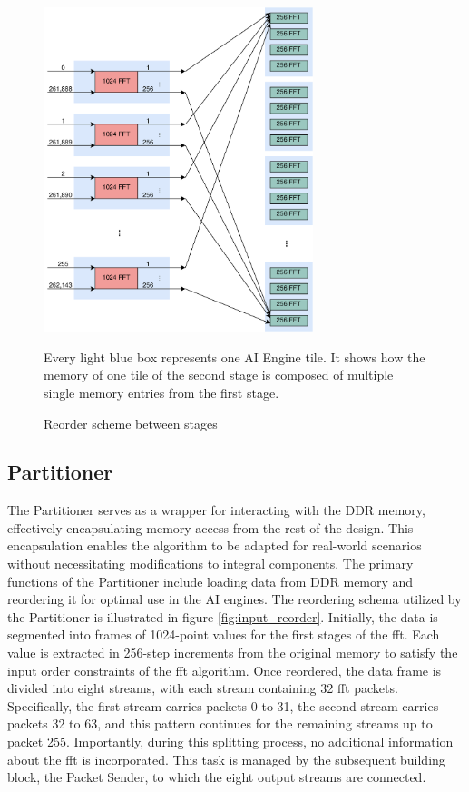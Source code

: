 \begin{figure}[h]
    \centering
    \includegraphics[width=0.7\textwidth]{images/stage_reorder.png}
    \captionsetup{justification=centering}
    \caption{Reorder scheme between stages}
            Every light blue box represents one AI Engine tile. It shows how the memory of one tile of the second stage is composed of multiple single memory entries from the first stage.
    \label{fig:stage_reorder}
\end{figure}

\subsection{Partitioner}
The Partitioner serves as a wrapper for interacting with the DDR memory, effectively encapsulating memory access from the rest of the design. This encapsulation enables the algorithm to be adapted for real-world scenarios without necessitating modifications to integral components. The primary functions of the Partitioner include loading data from DDR memory and reordering it for optimal use in the AI engines. The reordering schema utilized by the Partitioner is illustrated in figure \ref{fig:input_reorder}. Initially, the data is segmented into frames of 1024-point values for the first stages of the \ac{fft}. Each value is extracted in 256-step increments from the original memory to satisfy the input order constraints of the \ac{fft} algorithm. Once reordered, the data frame is divided into eight streams, with each stream containing 32 \ac{fft} packets. Specifically, the first stream carries packets 0 to 31, the second stream carries packets 32 to 63, and this pattern continues for the remaining streams up to packet 255. Importantly, during this splitting process, no additional information about the \ac{fft} is incorporated. This task is managed by the subsequent building block, the Packet Sender, to which the eight output streams are connected.

